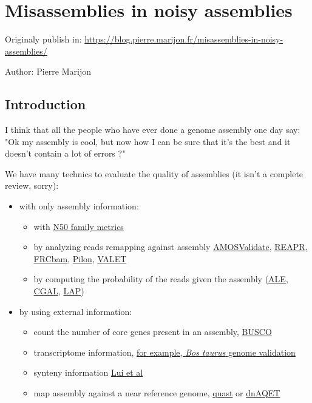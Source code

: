 \documentclass[./main.tex]{subfiles}
\begin{document}
\section{Misassemblies in noisy assemblies} \label{sec:preasm:blog}

Originaly publish in: \url{https://blog.pierre.marijon.fr/misassemblies-in-noisy-assemblies/}

Author: Pierre Marijon

\subsection{Introduction}

I think that all the people who have ever done a genome assembly one day
say: "Ok my assembly is cool, but now how I can be sure that it's the
best and it doesn't contain a lot of errors ?"

We have many technics to evaluate the quality of assemblies (it isn't a
complete review, sorry):

\begin{itemize}
\item with only assembly information:
  \begin{itemize}
  \item with \href{https://doi.org/10.1089/cmb.2017.0013}{N50 family metrics}
  \item by analyzing reads remapping against assembly \href{http://amos.sourceforge.net/wiki/index.php/Amosvalidate}{AMOSValidate}, \href{https://www.sanger.ac.uk/science/tools/reapr}{REAPR}, \href{https://github.com/vezzi/FRC_align}{FRCbam}, \href{https://github.com/broadinstitute/pilon/wiki}{Pilon}, \href{https://www.cbcb.umd.edu/software/valet}{VALET}
  \item by computing the probability of the reads given the assembly (\href{https://doi.org/10.1093/bioinformatics/bts723}{ALE}, \href{https://doi.org/10.1186/gb-2013-14-1-r8}{CGAL}, \href{https://doi.org/10.1186/1756-0500-6-334}{LAP})
  \end{itemize}
\item by using external information:
  \begin{itemize}
  \item count the number of core genes present in an assembly, \href{https://busco.ezlab.org/}{BUSCO}
  \item transcriptome information, \href{https://doi.org/10.1186/gb-2009-10-4-r42}{for example, \emph{Bos taurus} genome validation}
  \item synteny information \href{https://doi.org/10.1186/s12859-018-2026-4}{Lui et al}
  \item map assembly against a near reference genome, \href{https://doi.org/10.1093/bioinformatics/btt086}{quast} or \href{https://bmcgenomics.biomedcentral.com/articles/10.1186/s12864-019-6070-x}{dnAQET}
  \end{itemize}
\end{itemize}
\end{document}
